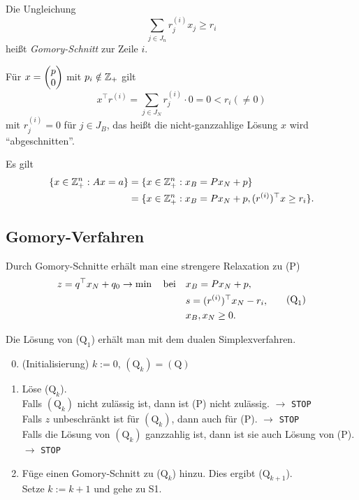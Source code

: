 \begin{defn}
  Die Ungleichung
  \[ \sum_{j \in J_n} r_j^{(i)} x_j \ge r_i \]
  heißt \emph{Gomory-Schnitt} zur Zeile $i$.
\end{defn}

\begin{rmrk*}
  Für $x = \begin{pmatrix}p \\ 0\end{pmatrix}$ mit $p_i \notin \mathbb{Z}_+$ gilt
  \[ x^\top r^{(i)} = \sum_{j \in J_N} r_j^{(i)} \cdot 0 = 0 < r_i (\ne 0) \]
  mit $r_j^{(i)} = 0$ für $j \in J_B$, das heißt die nicht-ganzzahlige Lösung
  $x$ wird ``abgeschnitten''.
\end{rmrk*}

\begin{flg}
  Es gilt
  \begin{align*}
    \{ x \in \mathbb{Z}_+^n : Ax = a \}
    &= \{ x \in \mathbb{Z}_+^n : x_B = P x_N + p \} \\
    &= \{ x \in \mathbb{Z}_+^n : x_B = P x_N + p, (r^{(i)})^\top x \ge r_i \}.
  \end{align*}
\end{flg}

\subsection{Gomory-Verfahren}
Durch Gomory-Schnitte erhält man eine strengere Relaxation zu (P)
\[ \begin{aligned}
    z = q^\top x_N + q_0 \to \min \subjto
    &x_B = P x_N + p, \\
    &s = (r^{(i)})^\top x_N - r_i, \\
    &x_B, x_N \ge 0. 
  \end{aligned} \tag{$\text{Q}_1$} \]

Die Lösung von ($\text{Q}_1$) erhält man mit dem dualen Simplexverfahren.
\begin{enumerate}[S1]
  \setcounter{enumi}{-1}
\item (Initialisierung) $k := 0$, $(\text{Q}_k) = (\text{Q})$
\item Löse ($\text{Q}_k$).\\
  Falls $(\text{Q}_k)$ nicht zulässig ist, dann ist (P) nicht zulässig.
  $\rightarrow$ \verb+STOP+ \\
  Falls $z$ unbeschränkt ist für $(\text{Q}_k)$, dann auch für (P). $\rightarrow$
  \verb+STOP+ \\
  Falls die Lösung von $(\text{Q}_k)$ ganzzahlig ist, dann ist sie auch
  Lösung von (P). $\rightarrow$ \verb+STOP+
\item Füge einen Gomory-Schnitt zu ($\text{Q}_k$) hinzu. Dies ergibt
  ($\text{Q}_{k+1}$). \\
  Setze $k := k + 1$ und gehe zu S1.
\end{enumerate}

